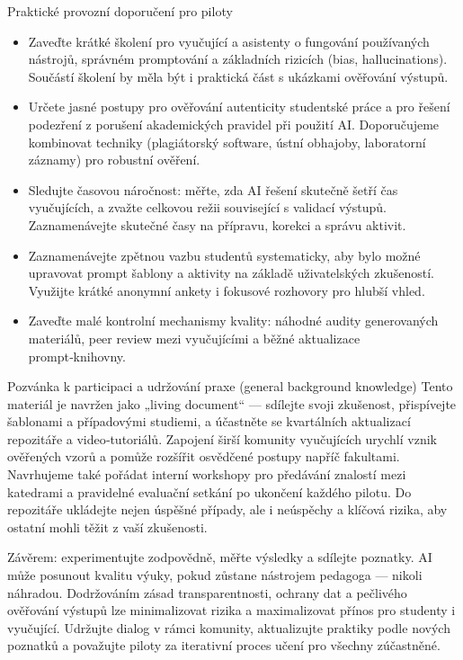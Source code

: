 Praktické provozní doporučení pro piloty
\begin{itemize}
\item Zaveďte krátké školení pro vyučující a asistenty o fungování používaných nástrojů, správném promptování a základních rizicích (bias, hallucinations). Součástí školení by měla být i praktická část s ukázkami ověřování výstupů.
\item Určete jasné postupy pro ověřování autenticity studentské práce a pro řešení podezření z porušení akademických pravidel při použití AI. Doporučujeme kombinovat techniky (plagiátorský software, ústní obhajoby, laboratorní záznamy) pro robustní ověření.
\item Sledujte časovou náročnost: měřte, zda AI řešení skutečně šetří čas vyučujících, a zvažte celkovou režii související s validací výstupů. Zaznamenávejte skutečné časy na přípravu, korekci a správu aktivit.
\item Zaznamenávejte zpětnou vazbu studentů systematicky, aby bylo možné upravovat prompt šablony a aktivity na základě uživatelských zkušeností. Využijte krátké anonymní ankety i fokusové rozhovory pro hlubší vhled.
\item Zaveďte malé kontrolní mechanismy kvality: náhodné audity generovaných materiálů, peer review mezi vyučujícími a běžné aktualizace prompt‑knihovny.
\end{itemize}

Pozvánka k participaci a udržování praxe
(general background knowledge) Tento materiál je navržen jako „living document“ — sdílejte svoji zkušenost, přispívejte šablonami a případovými studiemi, a účastněte se kvartálních aktualizací repozitáře a video‑tutoriálů. Zapojení širší komunity vyučujících urychlí vznik ověřených vzorů a pomůže rozšířit osvědčené postupy napříč fakultami. Navrhujeme také pořádat interní workshopy pro předávání znalostí mezi katedrami a pravidelné evaluační setkání po ukončení každého pilotu. Do repozitáře ukládejte nejen úspěšné případy, ale i neúspěchy a klíčová rizika, aby ostatní mohli těžit z vaší zkušenosti.

Závěrem: experimentujte zodpovědně, měřte výsledky a sdílejte poznatky. AI může posunout kvalitu výuky, pokud zůstane nástrojem pedagoga — nikoli náhradou. Dodržováním zásad transparentnosti, ochrany dat a pečlivého ověřování výstupů lze minimalizovat rizika a maximalizovat přínos pro studenty i vyučující. Udržujte dialog v rámci komunity, aktualizujte praktiky podle nových poznatků a považujte piloty za iterativní proces učení pro všechny zúčastněné.